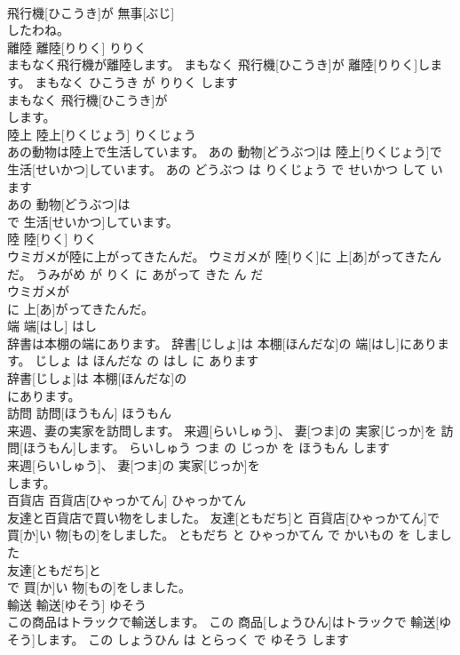 \documentclass[8pt]{extreport}
\begin{document}
\begin{CJK}{UTF8}{min}
\\	飛行機[ひこうき]が 無事[ぶじ]
\\	したわね。			
\\	離陸	離陸[りりく]	りりく	
\\	まもなく飛行機が離陸します。	まもなく 飛行機[ひこうき]が 離陸[りりく]します。	まもなく ひこうき が りりく します	
\\	まもなく 飛行機[ひこうき]が
\\	します。			
\\	陸上	陸上[りくじょう]	りくじょう	
\\	あの動物は陸上で生活しています。	あの 動物[どうぶつ]は 陸上[りくじょう]で 生活[せいかつ]しています。	あの どうぶつ は りくじょう で せいかつ して います	
\\	あの 動物[どうぶつ]は
\\	で 生活[せいかつ]しています。			
\\	陸	陸[りく]	りく	
\\	ウミガメが陸に上がってきたんだ。	ウミガメが 陸[りく]に 上[あ]がってきたんだ。	うみがめ が りく に あがって きた ん だ	
\\	ウミガメが
\\	に 上[あ]がってきたんだ。			
\\	端	端[はし]	はし	
\\	辞書は本棚の端にあります。	辞書[じしょ]は 本棚[ほんだな]の 端[はし]にあります。	じしょ は ほんだな の はし に あります	
\\	辞書[じしょ]は 本棚[ほんだな]の
\\	にあります。			
\\	訪問	訪問[ほうもん]	ほうもん	
\\	来週、妻の実家を訪問します。	来週[らいしゅう]、 妻[つま]の 実家[じっか]を 訪問[ほうもん]します。	らいしゅう つま の じっか を ほうもん します	
\\	来週[らいしゅう]、 妻[つま]の 実家[じっか]を
\\	します。			
\\	百貨店	百貨店[ひゃっかてん]	ひゃっかてん	
\\	友達と百貨店で買い物をしました。	友達[ともだち]と 百貨店[ひゃっかてん]で 買[か]い 物[もの]をしました。	ともだち と ひゃっかてん で かいもの を しました	
\\	友達[ともだち]と
\\	で 買[か]い 物[もの]をしました。			
\\	輸送	輸送[ゆそう]	ゆそう	
\\	この商品はトラックで輸送します。	この 商品[しょうひん]はトラックで 輸送[ゆそう]します。	この しょうひん は とらっく で ゆそう します	

\end{CJK}
\end{document}
